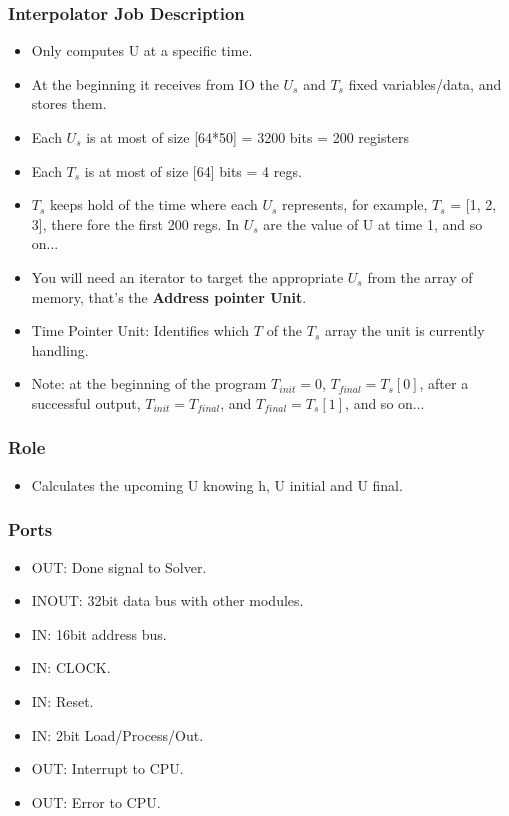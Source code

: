 \documentclass[12pt]{report}
\begin{document}
\subsubsection{Interpolator Job Description}
\begin{itemize}
    \item Only computes U at a specific time.
    \item At the beginning it receives from IO the $U_s$ and $T_s$ fixed variables/data, and stores them.
    \item Each $U_s$ is at most of size [64*50] = 3200 bits = 200 registers
    \item Each $T_s$ is at most of size [64] bits = 4 regs.
    \item $T_s$ keeps hold of the time where each $U_s$ represents, for example, $T_s$ = [1, 2, 3], there fore the first 200 regs. In $U_s$ are the value of U at time 1, and so on... 
    \item You will need an iterator to target the appropriate $U_s$ from the array of memory, that's the \textbf{Address pointer Unit}.
    \item {Time Pointer Unit}: Identifies which $T$ of the $T_s$ array the unit is currently handling.
    \item Note: at the beginning of the program $T_{init} = 0$, $T_{final} = T_s[0]$, after a successful output, $T_{init} = T_{final}$, and $T_{final} = T_s[1]$, and so on...
\end{itemize}

\subsubsection{Role}
\begin{itemize}
    \item Calculates the upcoming U knowing h, U initial and U final.
\end{itemize}

\subsubsection{Ports}
\begin{itemize}
    \item OUT: Done signal to Solver.
    \item INOUT: 32bit data bus with other modules.
    \item IN: 16bit address bus.
    \item IN: CLOCK.
    \item IN: Reset.
    \item IN: 2bit Load/Process/Out.
    \item OUT: Interrupt to CPU.
    \item OUT: Error to CPU.
\end{itemize}
\end{document}

